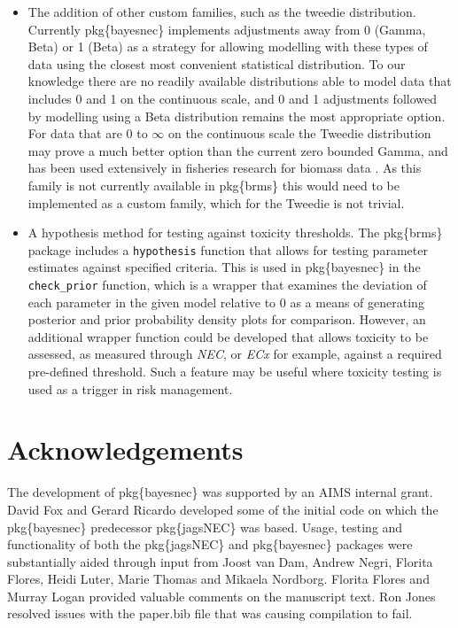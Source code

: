 \documentclass[
]{jss}
\begin{document}
\begin{itemize}
\item
  The addition of other custom families, such as the tweedie
  distribution. Currently pkg\{bayesnec\} implements adjustments away
  from 0 (Gamma, Beta) or 1 (Beta) as a strategy for allowing modelling
  with these types of data using the closest most convenient statistical
  distribution. To our knowledge there are no readily available
  distributions able to model data that includes 0 and 1 on the
  continuous scale, and 0 and 1 adjustments followed by modelling using
  a Beta distribution remains the most appropriate option. For data that
  are 0 to \(\infty\) on the continuous scale the Tweedie distribution
  may prove a much better option than the current zero bounded Gamma,
  and has been used extensively in fisheries research for biomass data
  \citep{Shono2008}. As this family is not currently available in
  pkg\{brms\} this would need to be implemented as a custom family,
  which for the Tweedie is not trivial.
\item
  A hypothesis method for testing against toxicity thresholds. The
  pkg\{brms\} package includes a \texttt{hypothesis} function that
  allows for testing parameter estimates against specified criteria.
  This is used in pkg\{bayesnec\} in the \texttt{check\_prior} function,
  which is a wrapper that examines the deviation of each parameter in
  the given model relative to 0 as a means of generating posterior and
  prior probability density plots for comparison. However, an additional
  wrapper function could be developed that allows toxicity to be
  assessed, as measured through \emph{NEC}, or \emph{ECx} for example,
  against a required pre-defined threshold. Such a feature may be useful
  where toxicity testing is used as a trigger in risk management.
\end{itemize}

\hypertarget{acknowledgements}{%
\section{Acknowledgements}\label{acknowledgements}}

The development of pkg\{bayesnec\} was supported by an AIMS internal
grant. David Fox and Gerard Ricardo developed some of the initial code
on which the pkg\{bayesnec\} predecessor pkg\{jagsNEC\} was based.
Usage, testing and functionality of both the pkg\{jagsNEC\} and
pkg\{bayesnec\} packages were substantially aided through input from
Joost van Dam, Andrew Negri, Florita Flores, Heidi Luter, Marie Thomas
and Mikaela Nordborg. Florita Flores and Murray Logan provided valuable
comments on the manuscript text. Ron Jones resolved issues with the
paper.bib file that was causing compilation to fail.

\renewcommand\refname{References}

\end{document}
